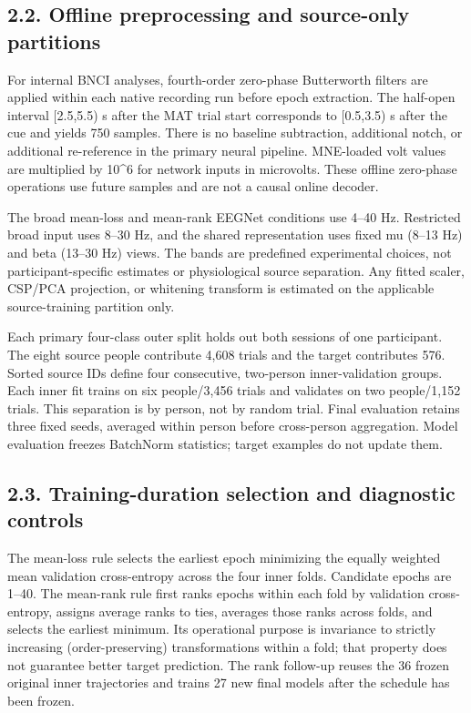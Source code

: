 \documentclass[11pt]{article}
\begin{document}
\subsection*{2.2. Offline preprocessing and source-only partitions}
For internal BNCI analyses, fourth-order zero-phase Butterworth filters are applied within each native recording run before epoch extraction. The half-open interval [2.5,5.5) s after the MAT trial start corresponds to [0.5,3.5) s after the cue and yields 750 samples. There is no baseline subtraction, additional notch, or additional re-reference in the primary neural pipeline. MNE-loaded volt values are multiplied by 10\textasciicircum{}6 for network inputs in microvolts. These offline zero-phase operations use future samples and are not a causal online decoder.

The broad mean-loss and mean-rank EEGNet conditions use 4--40 Hz. Restricted broad input uses 8--30 Hz, and the shared representation uses fixed mu (8--13 Hz) and beta (13--30 Hz) views. The bands are predefined experimental choices, not participant-specific estimates or physiological source separation. Any fitted scaler, CSP/PCA projection, or whitening transform is estimated on the applicable source-training partition only.

Each primary four-class outer split holds out both sessions of one participant. The eight source people contribute 4,608 trials and the target contributes 576. Sorted source IDs define four consecutive, two-person inner-validation groups. Each inner fit trains on six people/3,456 trials and validates on two people/1,152 trials. This separation is by person, not by random trial. Final evaluation retains three fixed seeds, averaged within person before cross-person aggregation. Model evaluation freezes BatchNorm statistics; target examples do not update them.

\subsection*{2.3. Training-duration selection and diagnostic controls}
The mean-loss rule selects the earliest epoch minimizing the equally weighted mean validation cross-entropy across the four inner folds. Candidate epochs are 1--40. The mean-rank rule first ranks epochs within each fold by validation cross-entropy, assigns average ranks to ties, averages those ranks across folds, and selects the earliest minimum. Its operational purpose is invariance to strictly increasing (order-preserving) transformations within a fold; that property does not guarantee better target prediction. The rank follow-up reuses the 36 frozen original inner trajectories and trains 27 new final models after the schedule has been frozen.
\end{document}
